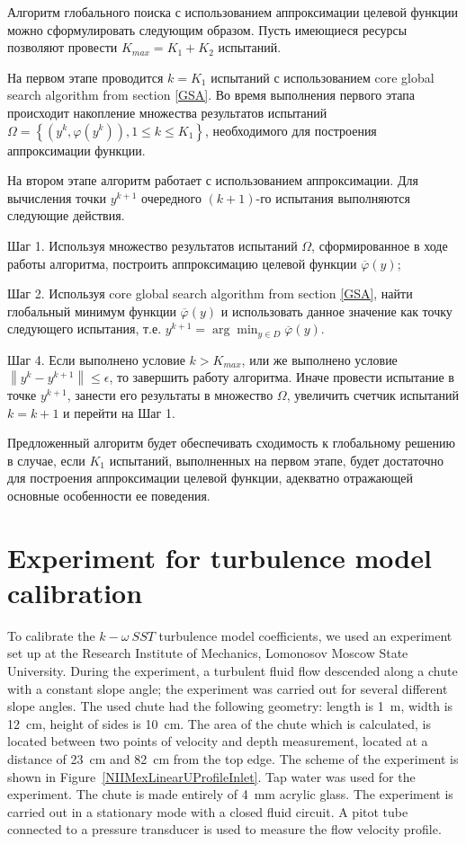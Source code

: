 \documentclass[sensors,article,submit,moreauthors,pdftex]{Definitions/mdpi}
\begin{document}
Алгоритм глобального поиска с использованием аппроксимации целевой функции можно сформулировать следующим образом. 
Пусть имеющиеся ресурсы позволяют провести $K_{max} = K_1 + K_2$ испытаний. 

На первом этапе проводится $k = K_1$ испытаний с использованием core global search algorithm from section \ref{GSA}.
Во время выполнения первого этапа происходит накопление множества результатов испытаний $\Omega = \left\{(y^k, \varphi(y^k)), 1\leq k\leq K_1\right\}$, необходимого для построения аппроксимации функции.

На втором этапе алгоритм работает с использованием аппроксимации. Для вычисления точки $y^{k+1}$ очередного $(k+1)$-го испытания выполняются следующие действия.

Шаг 1. Используя множество результатов испытаний $\Omega$, сформированное в ходе работы алгоритма, построить аппроксимацию целевой функции $\overline{\varphi}(y)$;

Шаг 2. Используя core global search algorithm from section \ref{GSA}, найти глобальный минимум функции $\overline{\varphi}(y)$ и использовать данное значение как точку следующего испытания, т.е. $y^{k+1} = \arg \min_{y \in D} \overline{\varphi}(y)$.

Шаг 4. Если выполнено условие $k>K_{max}$, или же выполнено условие $\left\|y^k - y^{k+1}\right\| \leq \epsilon$, то завершить работу алгоритма. 
Иначе провести испытание в точке $y^{k+1}$, занести его результаты в множество $\Omega$, увеличить счетчик испытаний $k = k+1$ и перейти на Шаг 1.

Предложенный алгоритм будет обеспечивать сходимость к глобальному решению в случае, если $K_1$ испытаний, выполненных на первом этапе, будет достаточно для построения аппроксимации целевой функции, адекватно отражающей основные особенности ее поведения. 


\section{Experiment for turbulence model calibration}

To calibrate the $k-\omega\ SST$ turbulence model coefficients, we used an experiment set up at the Research Institute of Mechanics, Lomonosov Moscow State University. During the experiment, a turbulent fluid flow descended along a chute with a constant slope angle; the experiment was carried out for several different slope angles. The used chute had the following geometry: length is 1~m, width is 12~cm, height of sides is 10~cm. The area of the chute which is calculated, is located between two points of velocity and depth measurement, located at a distance of 23~cm and 82~cm from the top edge. The scheme of the experiment is shown in Figure~\ref{NIIMexLinearUProfileInlet}. Tap water was used for the experiment. The chute is made entirely of 4~mm acrylic glass. The experiment is carried out in a stationary mode with a closed fluid circuit. A pitot tube connected to a pressure transducer is used to measure the flow velocity profile.
\end{document}
